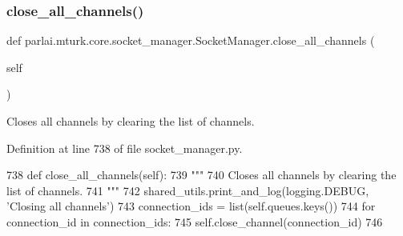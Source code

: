 \mbox{\label{classparlai_1_1mturk_1_1core_1_1socket__manager_1_1SocketManager_a9a2c04d9512e6866dfda33397d8f363c}} 
\subsubsection{\texorpdfstring{close\+\_\+all\+\_\+channels()}{close\_all\_channels()}}
{\footnotesize\ttfamily def parlai.\+mturk.\+core.\+socket\+\_\+manager.\+Socket\+Manager.\+close\+\_\+all\+\_\+channels (\begin{DoxyParamCaption}\item[{}]{self }\end{DoxyParamCaption})}

\begin{DoxyVerb}Closes all channels by clearing the list of channels.
\end{DoxyVerb}
 

Definition at line 738 of file socket\+\_\+manager.\+py.


\begin{DoxyCode}
738     \textcolor{keyword}{def }close\_all\_channels(self):
739         \textcolor{stringliteral}{"""}
740 \textcolor{stringliteral}{        Closes all channels by clearing the list of channels.}
741 \textcolor{stringliteral}{        """}
742         shared\_utils.print\_and\_log(logging.DEBUG, \textcolor{stringliteral}{'Closing all channels'})
743         connection\_ids = list(self.queues.keys())
744         \textcolor{keywordflow}{for} connection\_id \textcolor{keywordflow}{in} connection\_ids:
745             self.close\_channel(connection\_id)
746 
\end{DoxyCode}
\mbox{\label{classparlai_1_1mturk_1_1core_1_1socket__manager_1_1SocketManager_ae079bc95ebedcab4e52325253db490cf}} 
